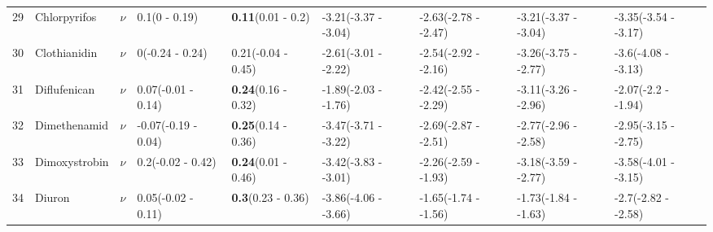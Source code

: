 \begin{longtable}{lp{2cm}p{0.6cm}p{1.8cm}p{1.8cm}p{1.8cm}p{1.8cm}p{1.8cm}p{1.8cm}}
  29 & Chlorpyrifos & $\nu$ & 0.1\newline (0 - 0.19) & \textbf{0.11}\newline (0.01 - 0.2) & -3.21\newline (-3.37 - -3.04) & -2.63\newline (-2.78 - -2.47) & -3.21\newline (-3.37 - -3.04) & -3.35\newline (-3.54 - -3.17) \\ 
  30 & Clothianidin & $\nu$ & 0\newline (-0.24 - 0.24) & 0.21\newline (-0.04 - 0.45) & -2.61\newline (-3.01 - -2.22) & -2.54\newline (-2.92 - -2.16) & -3.26\newline (-3.75 - -2.77) & -3.6\newline (-4.08 - -3.13) \\ 
  31 & Diflufenican & $\nu$ & 0.07\newline (-0.01 - 0.14) & \textbf{0.24}\newline (0.16 - 0.32) & -1.89\newline (-2.03 - -1.76) & -2.42\newline (-2.55 - -2.29) & -3.11\newline (-3.26 - -2.96) & -2.07\newline (-2.2 - -1.94) \\ 
  32 & Dimethenamid & $\nu$ & -0.07\newline (-0.19 - 0.04) & \textbf{0.25}\newline (0.14 - 0.36) & -3.47\newline (-3.71 - -3.22) & -2.69\newline (-2.87 - -2.51) & -2.77\newline (-2.96 - -2.58) & -2.95\newline (-3.15 - -2.75) \\ 
  33 & Dimoxystrobin & $\nu$ & 0.2\newline (-0.02 - 0.42) & \textbf{0.24}\newline (0.01 - 0.46) & -3.42\newline (-3.83 - -3.01) & -2.26\newline (-2.59 - -1.93) & -3.18\newline (-3.59 - -2.77) & -3.58\newline (-4.01 - -3.15) \\ 
  34 & Diuron & $\nu$ & 0.05\newline (-0.02 - 0.11) & \textbf{0.3}\newline (0.23 - 0.36) & -3.86\newline (-4.06 - -3.66) & -1.65\newline (-1.74 - -1.56) & -1.73\newline (-1.84 - -1.63) & -2.7\newline (-2.82 - -2.58) \\ 

\end{longtable}
